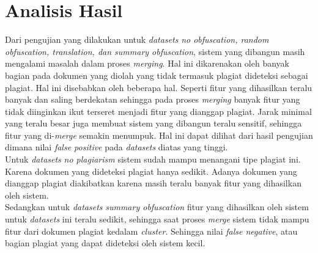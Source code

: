 \documentclass[../Book.tex]{subfiles}
\begin{document}
\section{Analisis Hasil}
Dari pengujian yang dilakukan untuk \textit{datasets} \textit{no obfuscation, random obfuscation, translation, dan summary obfuscation}, sistem yang dibangun masih mengalami masalah dalam proses \textit{merging}. Hal ini dikarenakan oleh banyak bagian pada dokumen yang diolah yang tidak termasuk plagiat dideteksi sebagai plagiat. Hal ini disebabkan oleh beberapa hal. Seperti fitur yang dihasilkan teralu banyak dan saling berdekatan sehingga pada proses \textit{merging} banyak fitur yang tidak diinginkan ikut terseret menjadi fitur yang dianggap plagiat. Jarak minimal yang teralu besar juga membuat sistem yang dibangun teralu sensitif, sehingga fitur yang di-\textit{merge} semakin menumpuk. Hal ini dapat dilihat dari hasil pengujian dimana nilai \textit{false positive} pada \textit{datasets} diatas yang tinggi. \\

\noindent Untuk \textit{datasets} \textit{no plagiarism} sistem sudah mampu menangani tipe plagiat ini. Karena dokumen yang dideteksi plagiat hanya sedikit. Adanya dokumen yang dianggap plagiat diakibatkan karena masih teralu banyak fitur yang dihasilkan oleh sistem. \\

\noindent Sedangkan untuk \textit{datasets} \textit{summary obfuscation} fitur yang dihasilkan oleh sistem untuk \textit{datasets} ini teralu sedikit, sehingga saat proses \textit{merge} sistem tidak mampu fitur dari dokumen plagiat kedalam \textit{cluster}. Sehingga nilai \textit{false negative}, atau bagian plagiat yang dapat dideteksi oleh sistem kecil.
\end{document}
